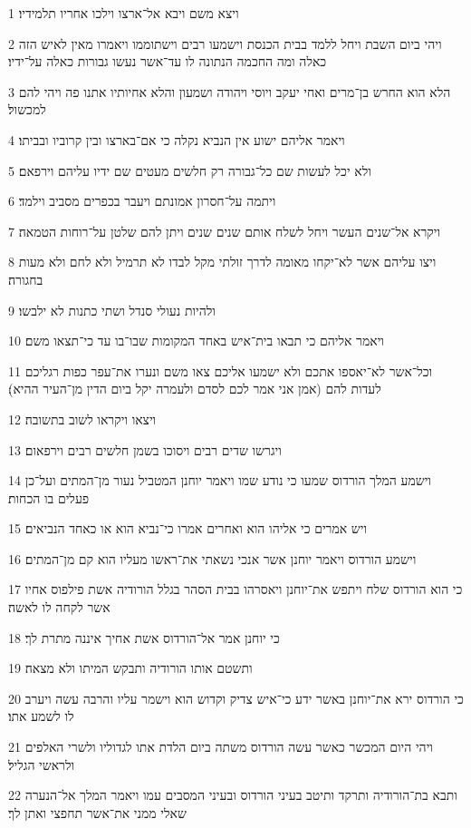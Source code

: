 \par 1 ויצא משם ויבא אל־ארצו וילכו אחריו תלמידיו׃
\par 2 ויהי ביום השבת ויחל ללמד בבית הכנסת וישמעו רבים וישתוממו ויאמרו מאין לאיש הזה כאלה ומה החכמה הנתונה לו עד־אשר נעשו גבורות כאלה על־ידיו׃
\par 3 הלא הוא החרש בן־מרים ואחי יעקב ויוסי ויהודה ושמעון והלא אחיותיו אתנו פה ויהי להם למכשול׃
\par 4 ויאמר אליהם ישוע אין הנביא נקלה כי אם־בארצו ובין קרוביו ובביתו׃
\par 5 ולא יכל לעשות שם כל־גבורה רק חלשים מעטים שם ידיו עליהם וירפאם׃
\par 6 ויתמה על־חסרון אמונתם ויעבר בכפרים מסביב וילמד׃
\par 7 ויקרא אל־שנים העשר ויחל לשלח אותם שנים שנים ויתן להם שלטן על־רוחות הטמאה׃
\par 8 ויצו עליהם אשר לא־יקחו מאומה לדרך זולתי מקל לבדו לא תרמיל ולא לחם ולא מעות בחגורה׃
\par 9 ולהיות נעולי סנדל ושתי כתנות לא ילבשו׃
\par 10 ויאמר אליהם כי תבאו בית־איש באחד המקומות שבו־בו עד כי־תצאו משם׃
\par 11 וכל־אשר לא־יאספו אתכם ולא ישמעו אליכם צאו משם ונערו את־עפר כפות רגליכם לעדות להם (אמן אני אמר לכם לסדם ולעמרה יקל ביום הדין מן־העיר ההיא)׃
\par 12 ויצאו ויקראו לשוב בתשובה׃
\par 13 ויגרשו שדים רבים ויסוכו בשמן חלשים רבים וירפאום׃
\par 14 וישמע המלך הורדוס שמעו כי נודע שמו ויאמר יוחנן המטביל נעור מן־המתים ועל־כן פעלים בו הכחות׃
\par 15 ויש אמרים כי אליהו הוא ואחרים אמרו כי־נביא הוא או כאחד הנביאים׃
\par 16 וישמע הורדוס ויאמר יוחנן אשר אנכי נשאתי את־ראשו מעליו הוא קם מן־המתים׃
\par 17 כי הוא הורדוס שלח ויתפש את־יוחנן ויאסרהו בבית הסהר בגלל הורודיה אשת פילפוס אחיו אשר לקחה לו לאשה׃
\par 18 כי יוחנן אמר אל־הורדוס אשת אחיך איננה מתרת לך׃
\par 19 ותשטם אותו הורודיה ותבקש המיתו ולא מצאה׃
\par 20 כי הורדוס ירא את־יוחנן באשר ידע כי־איש צדיק וקדוש הוא וישמר עליו והרבה עשה ויערב לו לשמע אתו׃
\par 21 ויהי היום המכשר כאשר עשה הורדוס משתה ביום הלדת אתו לגדוליו ולשרי האלפים ולראשי הגליל׃
\par 22 ותבא בת־הורודיה ותרקד ותיטב בעיני הורדוס ובעיני המסבים עמו ויאמר המלך אל־הנערה שאלי ממני את־אשר תחפצי ואתן לך׃
